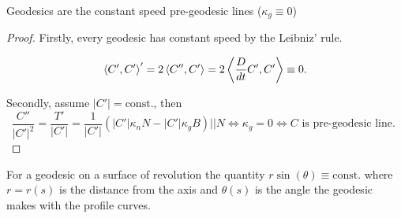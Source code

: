 \begin{theorem}
	
	Geodesics are the constant speed pre-geodesic lines ($ \kappa_g \equiv 0 $)
	
\end{theorem}

\begin{proof}
	Firstly, every geodesic has constant speed by the Leibniz' rule.
	
		\[ \left \langle C',C' \right\rangle' = 2\left \langle C'',C' \right\rangle= 2\left \langle \dfrac{D}{dt}C',C' \right\rangle \equiv 0. \]
		
	Secondly, assume $ |C'|= \mathrm{const.} $, then
		\[ \dfrac{C''}{|C'|^2} = \dfrac{T'}{|C'|}= \dfrac{1}{|C'|}(|C'|\kappa_nN - |C'| \kappa_gB) || N \Leftrightarrow \kappa_g = 0 \Leftrightarrow C \text{ is pre-geodesic line. } \]
		
\end{proof}

\begin{theorem}
	For a geodesic on a surface of revolution the quantity $ r\sin(\theta) \equiv \mathrm{const.} $ where $ r = r(s) $ is the distance from the axis and $ \theta(s) $ is the angle the geodesic makes with the profile curves.
	
\end{theorem}

